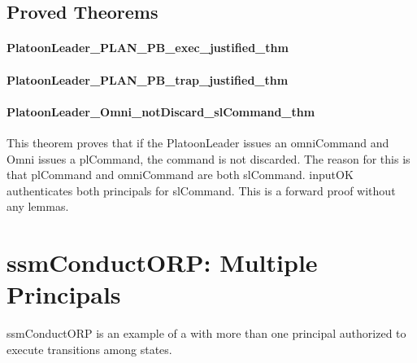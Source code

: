 \documentclass[../../main/main.tex]{subfiles}
\begin{document}
\HOLPBIntegratedDefDefinitionssecAuthorizationXXdef

\HOLPBIntegratedDefDefinitionssecHelperXXdef


\subsection{Proved Theorems}

\paragraph*{PlatoonLeader_PLAN_PB_exec_justified_thm}
\HOLssmPBIntegratedTheoremsPlatoonLeaderXXPLANXXPBXXexecXXjustifiedXXthm
\HOLssmPBIntegratedTheoremsPlatoonLeaderXXPLANXXPBXXexecXXlemma

\paragraph*{PlatoonLeader_PLAN_PB_trap_justified_thm}
\HOLssmPBIntegratedTheoremsPlatoonLeaderXXPLANXXPBXXtrapXXjustifiedXXlemma
\HOLssmPBIntegratedTheoremsPlatoonLeaderXXPLANXXPBXXtrapXXjustifiedXXthm
\HOLssmPBIntegratedTheoremsPlatoonLeaderXXPLANXXPBXXtrapXXlemma

\paragraph*{PlatoonLeader_Omni_notDiscard_slCommand_thm}
This theorem proves that if the PlatoonLeader issues an omniCommand and Omni issues a plCommand, the command is not discarded.  The reason for this is that plCommand and omniCommand are both slCommand.  inputOK authenticates both principals for slCommand.  This is a forward proof without any lemmas.

\HOLssmPBIntegratedTheoremsPlatoonLeaderXXOmniXXnotDiscardXXslCommandXXthm

     
\section{ssmConductORP: Multiple Principals}
ssmConductORP is an example of a  with more than one principal authorized to execute transitions among states.
\end{document}
